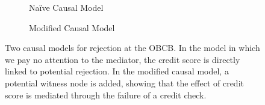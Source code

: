 \documentclass[twoside,11pt]{article}
\begin{document}
\begin{figure} 
    \centering
    \hspace{-1cm}
    \begin{subfigure}[t]{0.42\textwidth}
    \centering
        \caption{Na\"ive Causal Model}
    \end{subfigure}
    \begin{subfigure}[t]{0.46\textwidth}
    \centering
        \caption{Modified Causal Model}
    \end{subfigure}
    \caption{Two causal models for rejection at the OBCB. In the model in which we pay no attention to the mediator, the credit score is directly linked to potential rejection. In the modified causal model, a potential witness node is added, showing that the effect of credit score is mediated through the failure of a credit check.}
    \label{fig:obcb_causal_models}
\end{figure}
\end{document}
